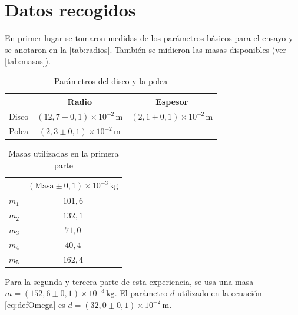 \documentclass[a4paper]{article}
\begin{document}
\section{Datos recogidos}
En primer lugar se tomaron medidas de los parámetros básicos para el ensayo y se anotaron en la  \autoref{tab:radios}. También se midieron las masas disponibles   (ver \autoref{tab:masas}).
\begin{table}
\begin{center}
\begin{tabular}{|c|c|c|}
\cline{2-3}
\multicolumn{1}{c|}{}& Radio & Espesor\\
\hline
Disco&$\left(12,7\pm 0,1\right)\times 10^{-2}\,\text{m}$&$\left(2,1\pm 0,1\right)\times 10^{-2}\,\text{m}$\\
\hline
Polea&$\left(2,3\pm 0,1\right)\times 10^{-2}\,\text{m}$&\multicolumn{1}{c}{}\\
\cline{1-2}
\end{tabular}
\caption{Parámetros del disco y la polea}
\label{tab:radios}
\end{center}
\end{table}
\begin{table}
\begin{center}
\begin{tabular}{|c|c|}
\cline{2-2}
\multicolumn{1}{c|}{}&$\left( \text{Masa}\pm 0,1\right) \times 10^{-3}\,\text{kg}$\\ \hline
$m_1$&$101,6$\\ \hline
$m_2$&$132,1$\\ \hline
$m_3$&$71,0$\\ \hline
$m_4$&$40,4$\\ \hline
$m_5$&$162,4$\\ \hline
\end{tabular}
\caption{Masas utilizadas en la primera parte}
\label{tab:masas}
\end{center}
\end{table}
Para la segunda y tercera parte de esta experiencia, se usa una masa $m=\left(152,6\pm 0,1\right)\times 10^{-3}\,\text{kg}$. El parámetro $d$ utilizado en la ecuación \eqref{eq:defOmega} es $d=\left(32,0\pm 0,1\right)\times 10^{-2}\, \text{m}$. 
\end{document}
